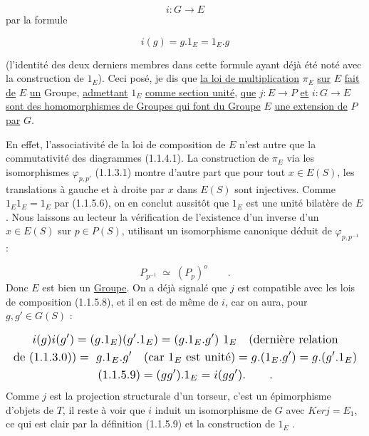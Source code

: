 \begin{equation*}
i : G \longrightarrow E
\end{equation*}
par la formule

\begin{equation}\tag{1.1.5.9}
i(g) = g.1_E = 1_E.g 
\end{equation}


 (l'identité des deux derniers membres dans cette formule ayant déjà été noté avec la construction de $1_E$). Ceci posé, je dis que \underline{la loi de multiplication} $\pi_E$ \underline{sur} $E$ \underline{fait de} $E$ \underline{un} Groupe, \underline{admettant} $1_E$ \underline{comme section unité}, \underline{que} $j : E \rightarrow P$ \underline{et} $i : G \rightarrow E$ \underline{sont des homomorphismes de Groupes qui font du Groupe} $E$ \underline{une extension de} $P$ \underline{par} $G$.

En effet, l'associativité de la loi de composition de $E$ n'est autre que la commutativité des diagrammes (1.1.4.1). La construction de $\pi_E$ via les isomorphismes $\varphi_{p,p'}$ (1.1.3.1) montre d'autre part que pour tout $x \in E(S)$, les translations à gauche et à droite par $x$ dans $E(S)$ sont injectives. Comme $1_E1_E = 1_E$ par (1.1.5.6), on en conclut aussitôt que $1_E$ est une unité bilatère de $E$. Nous laissons au lecteur la vérification de l'existence d'un inverse d'un $x \in E(S)$ sur $p \in P(S)$, utilisant un isomorphisme canonique déduit de $\varphi_{p,p^{-1}}$ :

\begin{equation}\tag{1.1.5.10}
P_{p^{-1}} \;\simeq\; (P_p)^{o} \qquad .
\end{equation}
Donc $E$ est bien un \underline{Groupe}. On a déjà signalé que $j$ est compatible avec les lois de composition (1.1.5.8), et il en est de même de $i$, car on aura, pour $g,g' \in G(S)$ :

\begin{equation*}
\resizebox{\textwidth}{!}{$\begin{gathered}
i(g)i(g') = (g.1_E)(g'.1_E) = (g.1_E.g')\ 1_E \quad (\text{dernière relation} \\
\text{de } (1.1.3.0)) = \ g.1_E.g' \quad (\text{car } 1_E \text{ est unité}) = g.(1_E.g') = g.(g'.1_E) \\
(1.1.5.9) = (gg').1_E = i(gg'). \qquad .
\end{gathered}$}
\end{equation*}
Comme $j$ est la projection structurale d'un torseur, c'est un épimorphisme d'objets de \underline{$T$}, il reste à voir que $i$ induit un isomorphisme de $G$ avec $Ker j = E_1$, ce qui est clair par la définition (1.1.5.9) et la construction de $1_E$ .



